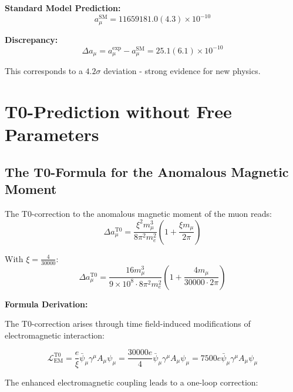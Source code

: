 \documentclass[12pt,a4paper]{report}
\newcommand{\xipar}{\xi}      %
\begin{document}
	\textbf{Standard Model Prediction:}
	\begin{equation}\label{eq:sm_prediction}
		a_\mu^{\text{SM}} = 11659181.0(4.3) \times 10^{-10}
	\end{equation}
	
	\textbf{Discrepancy:}
	\begin{equation}\label{eq:discrepancy}
		\Delta a_\mu = a_\mu^{\text{exp}} - a_\mu^{\text{SM}} = 25.1(6.1) \times 10^{-10}
	\end{equation}
	
	This corresponds to a $4.2\sigma$ deviation - strong evidence for new physics.
	
	\section{T0-Prediction without Free Parameters}\label{sec:t0_prediction}
	
	\subsection{The T0-Formula for the Anomalous Magnetic Moment}\label{subsec:t0_formula}
	
	The T0-correction to the anomalous magnetic moment of the muon reads:
	\begin{equation}
		\Delta a_\mu^{\text{T0}} = \frac{\xipar^2 m_\mu^3}{8\pi^2 m_e^2} \left(1 + \frac{\xipar m_\mu}{2\pi}\right)
	\end{equation}
	
	With $\xipar = \frac{4}{30000}$:
	\begin{equation}
		\Delta a_\mu^{\text{T0}} = \frac{16 m_\mu^3}{9 \times 10^8 \cdot 8\pi^2 m_e^2} \left(1 + \frac{4 m_\mu}{30000 \cdot 2\pi}\right)
	\end{equation}
	
	\textbf{Formula Derivation:}
	
	The T0-correction arises through time field-induced modifications of electromagnetic interaction:
	
	\begin{equation}\label{eq:timefield_em_coupling}
		\mathcal{L}_{\text{EM}}^{\text{T0}} = \frac{e}{\xipar} \bar{\psi}_\mu \gamma^\mu A_\mu \psi_\mu = \frac{30000 e}{4} \bar{\psi}_\mu \gamma^\mu A_\mu \psi_\mu = 7500 e \bar{\psi}_\mu \gamma^\mu A_\mu \psi_\mu
	\end{equation}
	
	The enhanced electromagnetic coupling leads to a one-loop correction:
	
\end{document}
